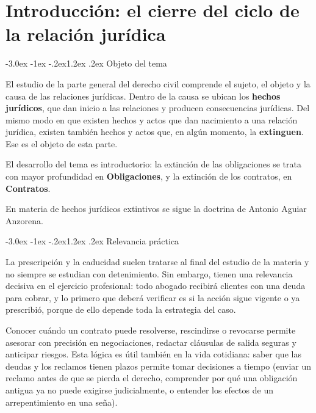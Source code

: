 \documentclass[12pt,oneside]{book}
\makeatletter
\renewcommand\section{\@startsection{section}{1}{\z@}%
  {-3.0ex \@plus -1ex \@minus -.2ex}{1.2ex \@plus .2ex}%
  {\normalfont\large\bfseries\color{acento}}}
\makeatother
\begin{document}
\chapter{Introducción: el cierre del ciclo de la relación jurídica}

\section{Objeto del tema}

El estudio de la parte general del derecho civil comprende el sujeto, el objeto y la causa de las relaciones jurídicas. Dentro de la causa se ubican los \textbf{hechos jurídicos}, que dan inicio a las relaciones y producen consecuencias jurídicas. Del mismo modo en que existen hechos y actos que dan nacimiento a una relación jurídica, existen también hechos y actos que, en algún momento, la \textbf{extinguen}. Ese es el objeto de esta parte.

\begin{nota}
El desarrollo del tema es introductorio: la extinción de las obligaciones se trata con mayor profundidad en \textbf{Obligaciones}, y la extinción de los contratos, en \textbf{Contratos}.
\end{nota}

En materia de hechos jurídicos extintivos se sigue la doctrina de Antonio Aguiar Anzorena.

\section{Relevancia práctica}

La prescripción y la caducidad suelen tratarse al final del estudio de la materia y no siempre se estudian con detenimiento. Sin embargo, tienen una relevancia decisiva en el ejercicio profesional: todo abogado recibirá clientes con una deuda para cobrar, y lo primero que deberá verificar es si la acción sigue vigente o ya prescribió, porque de ello depende toda la estrategia del caso.

Conocer cuándo un contrato puede resolverse, rescindirse o revocarse permite asesorar con precisión en negociaciones, redactar cláusulas de salida seguras y anticipar riesgos. Esta lógica es útil también en la vida cotidiana: saber que las deudas y los reclamos tienen plazos permite tomar decisiones a tiempo (enviar un reclamo antes de que se pierda el derecho, comprender por qué una obligación antigua ya no puede exigirse judicialmente, o entender los efectos de un arrepentimiento en una seña).
\end{document}
